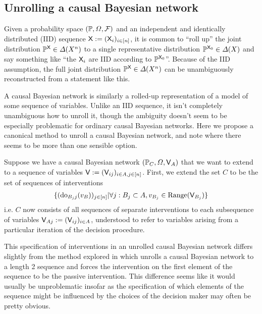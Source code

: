 \subsection{Unrolling a causal Bayesian network}\label{sec:unrolling}

Given a probability space $(\mathbb{P},\Omega,\mathcal{F})$ and an independent and identically distributed (IID) sequence $\mathsf{X}:=(\mathsf{X}_i)_{i\in [n]}$, it is common to ``roll up'' the joint distribution $\mathbb{P}^{\mathsf{X}}\in\Delta(X^n)$ to a single representative distribution $\mathbb{P}^{\mathsf{X}_0}\in \Delta(X)$ and say something like ``the $\mathsf{X}_i$ are IID according to $\mathbb{P}^{\mathsf{X}_0}$''. Because of the IID assumption, the full joint distribution $\mathbb{P}^{\mathsf{X}}\in\Delta(X^n)$ can be unambiguously reconstructed from a statement like this.

A causal Bayesian network is similarly a rolled-up representation of a model of some sequence of variables. Unlike an IID sequence, it isn't completely unambiguous how to unroll it, though the ambiguity doesn't seem to be especially problematic for ordinary causal Bayesian networks. Here we propose a canonical method to unroll a causal Bayesian network, and note where there seems to be more than one sensible option.

Suppose we have a causal Bayesian network $(\mathbb{P}_C,\Omega,\mathsf{V}_A)$ that we want to extend to a sequence of variables $\mathsf{V}:= (\mathsf{V}_{ij})_{i\in A,j\in [n]}$. First, we extend the set $C$ to be the set of sequences of interventions 
\begin{align}
\{(\mathrm{do}_{B_j j}(v_B))_{j\in [n]}|\forall j: B_j \subset A,v_{B_j}\in \mathrm{Range}(\mathsf{V}_{B_j})\}
\end{align}
i.e. $C$ now consists of all sequences of separate interventions to each subsequence of variables $\mathsf{V}_{Aj}:=(\mathsf{V}_{ij})_{i\in A}$, understood to refer to variables arising from a particular iteration of the decision procedure. 

This specification of interventions in an unrolled causal Bayesian network differs slightly from the method explored in \citet{lattimore_causal_2019} which unrolls a causal Bayesian network to a length 2 sequence and forces the intervention on the first element of the sequence to be the passive intervention. This difference seems like it would usually be unproblematic insofar as the specification of which elements of the sequence might be influenced by the choices of the decision maker may often be pretty obvious.

